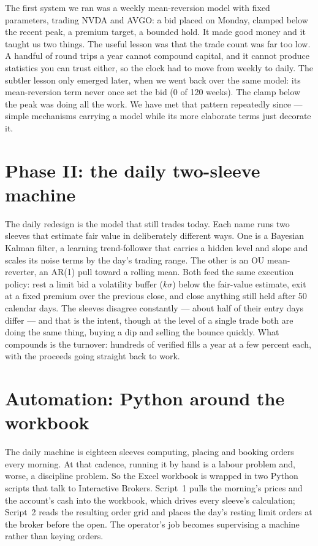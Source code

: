 \documentclass[11pt,a4paper]{article}
\begin{document}
The first system we ran was a weekly mean-reversion model with fixed
parameters, trading NVDA and AVGO: a bid placed on Monday, clamped below the
recent peak, a premium target, a bounded hold. It made good money and it
taught us two things. The useful lesson was that the trade count was far too
low. A handful of round trips a year cannot compound capital, and it cannot
produce statistics you can trust either, so the clock had to move from weekly
to daily. The subtler lesson only emerged later, when we went back over the
same model: its mean-reversion term never once set the bid (0 of 120 weeks).
The clamp below the peak was doing all the work. We have met that pattern
repeatedly since --- simple mechanisms carrying a model while its more
elaborate terms just decorate it.

\section{Phase II: the daily two-sleeve machine}

The daily redesign is the model that still trades today. Each name runs two
sleeves that estimate fair value in deliberately different ways. One is a
Bayesian Kalman filter, a learning trend-follower that carries a hidden level
and slope and scales its noise terms by the day's trading range. The other is
an OU mean-reverter, an AR(1) pull toward a rolling mean. Both feed the same
execution policy: rest a limit bid a volatility buffer ($k\sigma$) below the
fair-value estimate, exit at a fixed premium over the previous close, and
close anything still held after 50 calendar days. The sleeves disagree
constantly --- about half of their entry days differ --- and that is the
intent, though at the level of a single trade both are doing the same thing,
buying a dip and selling the bounce quickly. What compounds is the turnover:
hundreds of verified fills a year at a few percent each, with the proceeds
going straight back to work.

\section{Automation: Python around the workbook}

The daily machine is eighteen sleeves computing, placing and booking orders
every morning. At that cadence, running it by hand is a labour problem and,
worse, a discipline problem. So the Excel workbook is wrapped in two Python
scripts that talk to Interactive Brokers. Script~1 pulls the morning's prices
and the account's cash into the workbook, which drives every sleeve's
calculation; Script~2 reads the resulting order grid and places the day's
resting limit orders at the broker before the open. The operator's job
becomes supervising a machine rather than keying orders.
\end{document}
